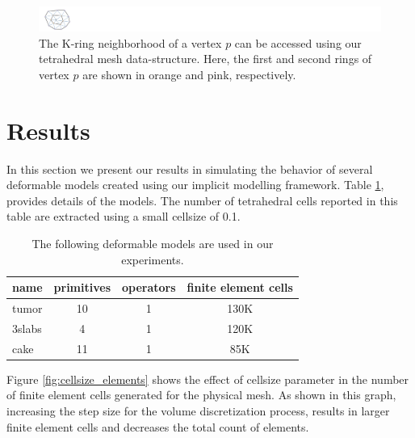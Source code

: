  \begin{figure}[H]
  \centering
  \includegraphics[width=7.0\linewidth]{figures/deformable/kring.pdf}
  \caption{\label{fig:kring}
  {The K-ring neighborhood of a vertex $p$ can be accessed using our tetrahedral mesh 
  data-structure. Here, the first and second rings of vertex $p$ are shown in orange and pink, respectively.}
}
\end{figure}


\section{Results}
In this section we present our results in simulating the behavior of several deformable models created 
using our implicit modelling framework. Table \ref{table:deformablemodels}, provides details of the 
models. The number of tetrahedral cells reported in this table are extracted using a small cellsize of 0.1. 

\begin{table}[H]
\begin{center}
\caption{\label{table:deformablemodels}
{The following deformable models are used in our experiments.}}
  \begin{tabular}{ | l | c | c | c | }
    \hline    
    name & primitives & operators & finite element cells \\ \hline \hline    
    tumor & 10 & 1 & 130K \\ \hline
    3slabs & 4 & 1 & 120K \\ \hline
    cake & 11 & 1 & 85K \\ \hline
    \hline
  \end{tabular}
\end{center}
\end{table}

Figure \ref{fig:cellsize_elements} shows the effect of cellsize parameter in the number of finite element 
cells generated for the physical mesh. As shown in this graph, increasing the step size for the volume 
discretization process, results in larger finite element cells and decreases the total count of elements.


